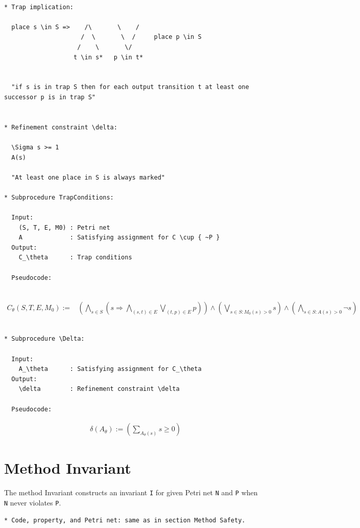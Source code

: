 \documentclass{llncs}
\begin{document}
\begin{verbatim}

* Trap implication:

  place s \in S =>    /\       \    /
                     /  \       \  /     place p \in S
                    /    \       \/
                   t \in s*   p \in t*   


  "if s is in trap S then for each output transition t at least one successor p is in trap S"


* Refinement constraint \delta:

  \Sigma s >= 1  
  A(s)

  "At least one place in S is always marked"

* Subprocedure TrapConditions:

  Input:
    (S, T, E, M0) : Petri net
    A             : Satisfying assignment for C \cup { ~P }
  Output:
    C_\theta      : Trap conditions

  Pseudocode:
  
\end{verbatim}
\begin{align*}
  C_\theta(S, T, E, M_0) :=& \left( \bigwedge_{s \in S} \left( s \Rightarrow
      \bigwedge_{(s, t) \in E} \bigvee_{(t, p) \in E} p
    \right) \right) \land
    \left( \bigvee_{s \in S: M_0(s) > 0} s \right) \land
    \left( \bigwedge_{s \in S: A(s) > 0} \neg s \right)
\end{align*}
\begin{verbatim}

* Subprocedure \Delta:

  Input:
    A_\theta      : Satisfying assignment for C_\theta
  Output:
    \delta        : Refinement constraint \delta

  Pseudocode:

\end{verbatim}
\begin{align*}
  & \delta(A_\theta) := \left( \sum_{A_\theta(s)} s \ge 0 \right)
\end{align*}

\newpage
\section{Method Invariant}

The method Invariant constructs an invariant \verb=I= for given Petri net \verb=N= and \verb=P= when \verb=N= never violates \verb=P=.

\begin{verbatim}
* Code, property, and Petri net: same as in section Method Safety.
\end{verbatim}
\end{document}
